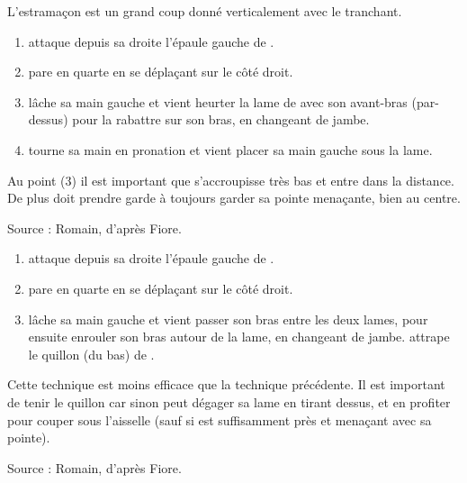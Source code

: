 \begin{coup}[Estramaçon]

L'estramaçon est un grand coup donné verticalement avec le tranchant.
\end{coup}


\begin{technique}

\begin{enumerate}
	\item \A attaque depuis sa droite l'épaule gauche de \D.
	\item \D pare en quarte en se déplaçant sur le côté droit.
	\item \D lâche sa main gauche et vient heurter la lame de \A avec son avant-bras (par-dessus) pour la rabattre sur son bras, en changeant de jambe.
	\item \D tourne sa main en pronation et vient placer sa main gauche sous la lame.
\end{enumerate}

Au point (3) il est important que \D s'accroupisse très bas et entre dans la distance.
De plus \D doit prendre garde à toujours garder sa pointe menaçante, bien au centre.

Source : Romain, d'après Fiore.

\end{technique}


\begin{technique}

\begin{enumerate}
	\item \A attaque depuis sa droite l'épaule gauche de \D.
	\item \D pare en quarte en se déplaçant sur le côté droit.
	\item \D lâche sa main gauche et vient passer son bras entre les deux lames, pour ensuite enrouler son bras autour de la lame, en changeant de jambe. \D attrape le quillon (du bas) de \A.
\end{enumerate}

Cette technique est moins efficace que la technique précédente.
Il est important de tenir le quillon car sinon \A peut dégager sa lame en tirant dessus, et en profiter pour couper sous l'aisselle (sauf si \D est suffisamment près et menaçant avec sa pointe).

Source : Romain, d'après Fiore.

\end{technique}


